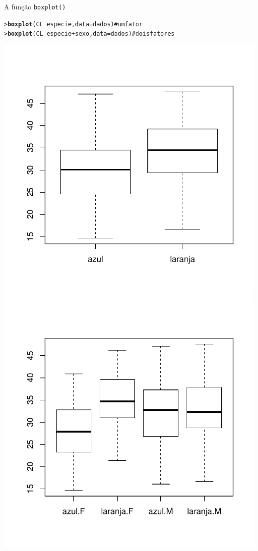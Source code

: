 \documentclass[10pt]{beamer}\usepackage{graphicx, color}
\makeatletter
\newcommand{\hlfunctioncall}[1]{\textcolor[rgb]{0,0,0.545098039215686}{\textbf{#1}}}%
\newcommand{\hlcomment}[1]{\textcolor[rgb]{0.2,0.2,0.2}{#1}}%
\newenvironment{kframe}{%
 \def\at@end@of@kframe{}%
 \ifinner\ifhmode%
  \def\at@end@of@kframe{\end{minipage}}%
  \begin{minipage}{\columnwidth}%
 \fi\fi%
 \def\FrameCommand##1{\hskip\@totalleftmargin \hskip-\fboxsep
 \colorbox{shadecolor}{##1}\hskip-\fboxsep
     \hskip-\linewidth \hskip-\@totalleftmargin \hskip\columnwidth}%
 \MakeFramed {\advance\hsize-\width
   \@totalleftmargin\z@ \linewidth\hsize
   \@setminipage}}%
 {\par\unskip\endMakeFramed%
 \at@end@of@kframe}
\newenvironment{knitrout}{}{} %
\makeatother
\begin{document}
\begin{frame}[fragile=singleslide]{A função \texttt{boxplot()}}
\begin{knitrout}\small
{}\color{fgcolor}\begin{kframe}
\begin{alltt}
> \hlfunctioncall{boxplot}(CL ~ especie, data = dados)        \hlcomment{# um fator}
> \hlfunctioncall{boxplot}(CL ~ especie + sexo, data = dados) \hlcomment{# dois fatores}
\end{alltt}
\end{kframe}

{\centering \includegraphics[width=.49\textwidth]{figure/unnamed-chunk-301} \includegraphics[width=.49\textwidth]{figure/unnamed-chunk-302} 

}


\end{knitrout}

\end{frame}
\end{document}
